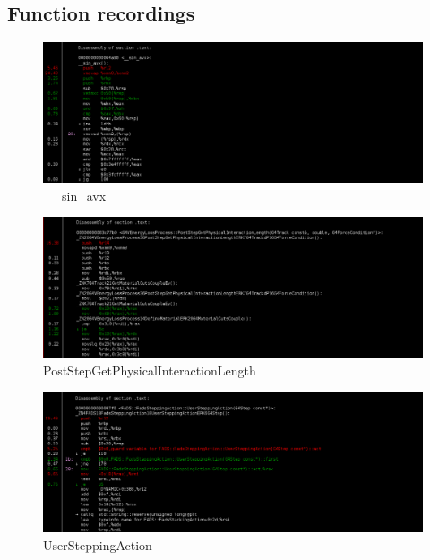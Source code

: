 \documentclass[a4paper]{jpconf}
\begin{document}
\begin{appendices}

\section{Function recordings}
\label{appending:function-recording}
\begin{figure}[H]
\begin{center}
\includegraphics[scale=0.33]{images/sin_P8.png}
\caption{\_\_sin\_avx}
\end{center}
\end{figure}

\begin{figure}[H]
\begin{center}
\includegraphics[scale=0.33]{images/Post_step_P8.png}
\caption{PostStepGetPhysicalInteractionLength}
\end{center}
\end{figure}

\begin{figure}[H]
\begin{center}
\includegraphics[scale=0.33]{images/UserStepping_P8.png}
\caption{UserSteppingAction}
\end{center}
\end{figure}


\end{appendices}
\end{document}
